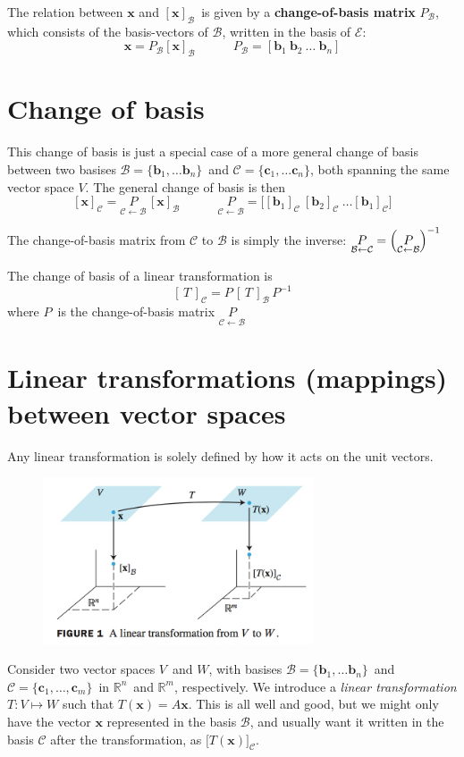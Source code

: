 \documentclass[12p,a4paper]{report}
\renewcommand{\b}{\boldsymbol}
\newcommand{\m}{\mathbb}
\begin{document}
The relation between $\b x$ and $[\b x]_\mathcal{B}$ is given by a \textbf{change-of-basis matrix} $P_\mathcal{B}$, which consists of the basis-vectors of $\mathcal{B}$, written in the basis of $\mathcal{E}$:
\[
    \b x = P_\mathcal{B}[\b x]_\mathcal{B}  \quad\quad\quad  P_\mathcal{B} = [\b b_1\ \b b_2\ \dots\ \b b_n]
\]


\section{Change of basis}
This change of basis is just a special case of a more general change of basis between two basises $\mathcal{B} = \{\b b_1, \dots \b b_n\}$ and $\mathcal{C} = \{\b c_1, \dots \b c_n\}$, both spanning the same vector space $V$. The general change of basis is then
\[
    [\b x]_\mathcal{C} = \underset{\mathcal{C}\leftarrow\mathcal{B}}{P}\,[\b x]_\mathcal{B} \quad\quad\quad
    \underset{\mathcal{C}\leftarrow\mathcal{B}}{P} = \Big[[\b b_1]_\mathcal{C}\ [\b b_2]_\mathcal{C}\ \dots [\b b_1]_\mathcal{C}\Big]
\]

The change-of-basis matrix from $\mathcal{C}$ to $\mathcal{B}$ is simply the inverse: $\underset{\mathcal{B}\leftarrow\mathcal{C}}{P} = \qty(\underset{\mathcal{C}\leftarrow\mathcal{B}}{P})^{-1}$

The change of basis of a linear transformation is
\[
    [\,T\,]_\mathcal{C} = P\, [\,T\,]_\mathcal{B}\, P^{-1}
\]
where $P$ is the change-of-basis matrix $\underset{\mathcal{C}\leftarrow\mathcal{B}}{P}$

\section{Linear transformations (mappings) between vector spaces}

Any linear transformation is solely defined by how it acts on the unit vectors.

\begin{figure}
    \includegraphics[width=8cm]{figs/map.jpg}
\end{figure} 
Consider two vector spaces $V$ and $W$, with basises $\mathcal{B} = \{\b b_1,\dots \b b_n\}$ and $\mathcal{C} = \{\b c_1,\dots, \b c_m\}$ in $\m R^n$ and $\m R^m$, respectively. We introduce a \textit{linear transformation} $T: V \mapsto W$ such that $T(\b x) = A\b x$. This is all well and good, but we might only have the vector $\b x$ represented in the basis $\mathcal{B}$, and usually want it written in the basis $\mathcal{C}$ after the transformation, as $\big[T(\b x)\big]_\mathcal{C}$.
\end{document}
